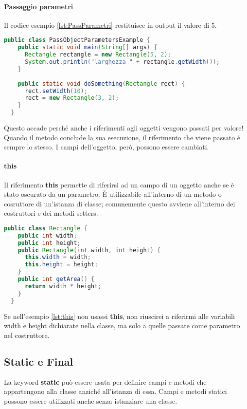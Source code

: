 \documentclass[a4paper,12pt,twoside]{book}
\begin{document}
\paragraph{Passaggio parametri}
Il codice esempio \ref{lst:PassParametri} restituisce in output il
valore di 5.

\begin{lstlisting}[caption={}, label={lst:PassParametri},
  language=Java]
  public class PassObjectParametersExample {
    public static void main(String[] args) {
      Rectangle rectangle = new Rectangle(5, 2);
      System.out.println("larghezza " + rectangle.getWidth());
    }
    
    public static void doSomething(Rectangle rect) {
      rect.setWidth(10);
      rect = new Rectangle(3, 2);
    }
  }
\end{lstlisting}

Questo accade perché anche i riferimenti agli oggetti vengono
passati per valore! Quando il metodo conclude la sua esecuzione, il
riferimento che viene passato è sempre lo stesso. I campi
dell’oggetto, però, possono essere cambiati.

\paragraph{this}
Il riferimento \textbf{this} permette di riferirsi ad un campo di un
oggetto anche se è stato oscurato da un parametro. È utilizzabile
all'interno di un metodo o cosruttore di un'istanza di classe;
comunemente questo avviene all'interno dei costruttori e dei metodi
setters.

\begin{lstlisting}[caption={}, label={lst:this},
  language=Java]
  public class Rectangle {
    public int width;
    public int height;
    public Rectangle(int width, int height) {
      this.width = width;
      this.height = height;
    }
    public int getArea() {
      return width * height;
    }
  }
\end{lstlisting}

Se nell'esempio \ref{lst:this} non usassi \textbf{this}, non riuscirei
a riferirmi alle variabili width e height dichiarate nella classe, ma
solo a quelle passate come parametro nel costruttore.

\subsection{Static e Final}

La keyword \textbf{static} può essere usata per definire campi e metodi che
appartengono alla classe anziché all’istanza di essa. Campi e metodi
statici possono essere utilizzati anche senza istanziare una classe.
\end{document}
